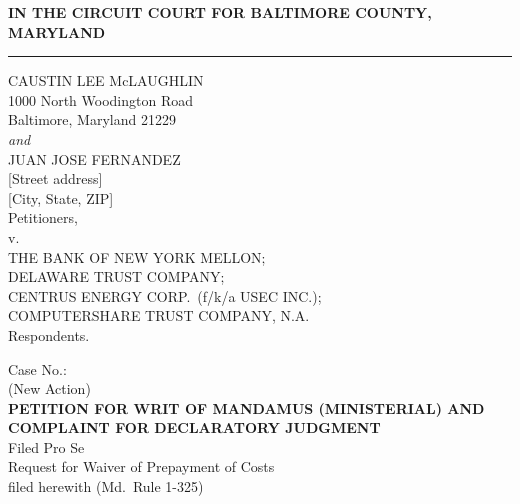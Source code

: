 \documentclass[12pt,letterpaper]{article}
\begin{document}
\thispagestyle{empty}
\begin{center}
\end{center}
\vspace{0.35in}

\begin{center}
\textbf{\large IN THE CIRCUIT COURT FOR BALTIMORE COUNTY, MARYLAND}
\end{center}
\vspace{2pt}\hrule\vspace{8pt}

\noindent
\begin{minipage}[t]{0.54\textwidth}
\raggedright
CAUSTIN LEE McLAUGHLIN\\
1000 North Woodington Road\\
Baltimore, Maryland 21229\\[5pt]
\hspace*{0.25in}\textit{and}\\[5pt]
JUAN JOSE FERNANDEZ\\
{[Street address]}\\
{[City, State, ZIP]}\\[8pt]
\hspace*{0.25in}Petitioners,\\[8pt]
\hspace*{0.25in}v.\\[8pt]
THE BANK OF NEW YORK MELLON;\\
DELAWARE TRUST COMPANY;\\
CENTRUS ENERGY CORP.\ (f/k/a USEC INC.);\\
COMPUTERSHARE TRUST COMPANY, N.A.\\[8pt]
\hspace*{0.25in}Respondents.
\end{minipage}\hfill
\begin{minipage}[t]{0.42\textwidth}
\raggedright
Case No.: \underline{\hspace{1.45in}}\\
(New Action)\\[12pt]
\textbf{PETITION FOR WRIT OF MANDAMUS (MINISTERIAL) AND COMPLAINT FOR DECLARATORY JUDGMENT}\\[10pt]
Filed Pro Se\\[4pt]
Request for Waiver of Prepayment of Costs\\
filed herewith (Md.\ Rule 1-325)
\end{minipage}
\end{document}
